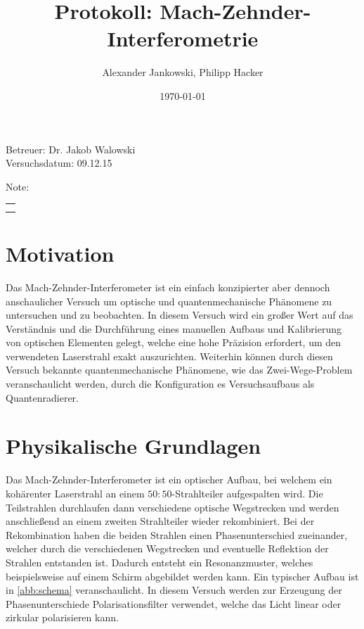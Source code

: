 \documentclass[numbers=noenddot,a4paper,notitlepage,twoside,BCOR15mm]{scrartcl}
\title{Protokoll: Mach-Zehnder-Interferometrie} %
\author{Alexander Jankowski, Philipp Hacker}
\date{\today}
\begin{document}
	\maketitle
	\begin{center}
		Betreuer: Dr. Jakob Walowski \\ %
		Versuchsdatum: 09.12.15\\ %
		\begin{table}[h]
			\centering
			Note: %
			\begin{tabularx}{1.5cm}{|X|}
				\hline \\ \\
				\hline
			\end{tabularx}
		\end{table}
	\end{center}
	\vspace*{\fill}
	\tableofcontents
	\vfill
	\newpage
	\section{Motivation}
	
	Das Mach-Zehnder-Interferometer ist ein einfach konzipierter aber dennoch anschaulicher Versuch um optische und quantenmechanische Phänomene zu untersuchen und zu beobachten. In diesem Versuch wird ein großer Wert auf das Verständnis und die Durchführung eines manuellen Aufbaus und Kalibrierung von optischen Elementen gelegt, welche eine hohe Präzision erfordert, um den verwendeten Laserstrahl exakt auszurichten. Weiterhin können durch diesen Versuch bekannte quantenmechanische Phänomene, wie das Zwei-Wege-Problem veranschaulicht werden, durch die Konfiguration es Versuchsaufbaus als Quantenradierer.
	
	\newpage
	\section{Physikalische Grundlagen}
	
	Das Mach-Zehnder-Interferometer ist ein optischer Aufbau, bei welchem ein kohärenter Laserstrahl an einem $50:50$-Strahlteiler aufgespalten wird. Die Teilstrahlen durchlaufen dann verschiedene optische Wegstrecken und werden anschließend an einem zweiten Strahlteiler wieder rekombiniert. Bei der Rekombination haben die beiden Strahlen einen Phasenunterschied zueinander, welcher durch die verschiedenen Wegstrecken und eventuelle Reflektion der Strahlen entstanden ist. Dadurch entsteht ein Resonanzmuster, welches beispielsweise auf einem Schirm abgebildet werden kann. Ein typischer Aufbau ist in \autoref{abb:schema} veranschaulicht. In diesem Versuch werden zur Erzeugung der Phasenunterschiede Polarisationsfilter verwendet, welche das Licht linear oder zirkular polarisieren kann.
	
\end{document}
